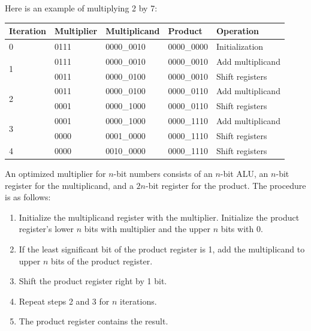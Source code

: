 \documentclass[a4paper,12pt]{article}
\begin{document}
Here is an example of multiplying 2 by 7:
\begin{table}[H]
	\centering
	\begin{tabular}{lllll}
		\toprule
		\textbf{Iteration} & \textbf{Multiplier} & \textbf{Multiplicand} & \textbf{Product} & \textbf{Operation} \\
		\midrule
		0 & 0111 & 0000\_0010 & 0000\_0000 & Initialization \\
		\midrule
		\multirow{2}{*}{1} & 0111 & 0000\_0010 & 0000\_0010 & Add multiplicand \\
		& 0011 & 0000\_0100 & 0000\_0010 & Shift registers \\
		\midrule
		\multirow{2}{*}{2} & 0011 & 0000\_0100 & 0000\_0110 & Add multiplicand \\
		& 0001 & 0000\_1000 & 0000\_0110 & Shift registers \\
		\midrule
		\multirow{2}{*}{3} & 0001 & 0000\_1000 & 0000\_1110 & Add multiplicand \\
		& 0000 & 0001\_0000 & 0000\_1110 & Shift registers \\
		\midrule
		4 & 0000 & 0010\_0000 & 0000\_1110 & Shift registers \\
		\bottomrule
	\end{tabular}
\end{table}

An optimized multiplier for $n$-bit numbers consists of an $n$-bit ALU, an $n$-bit register for the multiplicand, and a $2n$-bit register for the product. The procedure is as follows:
\begin{enumerate}
	\item Initialize the multiplicand register with the multiplier. Initialize the product register's lower $n$ bits with multiplier and the upper $n$ bits with 0.
	\item If the least significant bit of the product register is 1, add the multiplicand to upper $n$ bits of the product register.
	\item Shift the product register right by 1 bit.
	\item Repeat steps 2 and 3 for $n$ iterations.
	\item The product register contains the result.
\end{enumerate}
\end{document}
